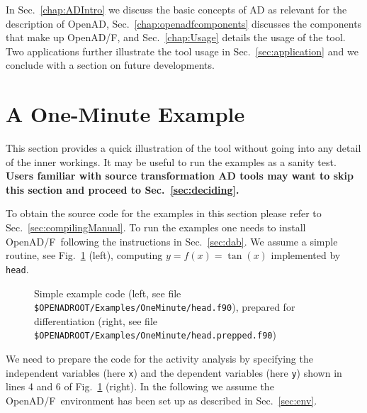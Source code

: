\documentclass{book}
\newcommand{\OpenADF}{OpenAD/F}
\newcommand{\OpenAD}{OpenAD}
\newcommand{\refsec}[1]{{Sec.~\ref{#1}}}
\newcommand{\reffig}[1]{{Fig.~\ref{#1}}}
\begin{document}
In \refsec{chap:ADIntro} we discuss the basic concepts of AD as relevant for 
the description of \OpenAD, \refsec{chap:openadfcomponents} discusses the components 
that make up \OpenADF, and \refsec{chap:Usage} details the usage of the tool. 
Two applications further illustrate the tool usage in \refsec{sec:application} and 
we conclude with a section on future developments.

\section{A One-Minute Example} \label{sec:oneMinute}

This section provides a quick illustration of the tool without going into any detail of 
the inner workings. It may be useful to run the examples as a sanity test. \\
{\bf {\Large \ForwardToIndex }  Users familiar with source transformation AD tools may want to skip this section and proceed  to \refsec{sec:deciding}.}

To obtain the source code for the examples in this section please refer to \refsec{sec:compilingManual}. 
To run the examples one needs to install \OpenADF\ following the instructions in \refsec{sec:dab}.
We assume a simple routine, see \reffig{fig:OneMinute} (left), computing $y=f(x)=\tan(x)$ implemented by \lstinline{head}.
\begin{figure}
\begin{minipage}[t]{.48\linewidth}
\scriptsize
\end{minipage}
\begin{minipage}[t]{.48\linewidth}
\scriptsize
\end{minipage}
\caption{Simple example code (left, see file 
\lstinline{$OPENADROOT/Examples/OneMinute/head.f90}), %
prepared for differentiation (right, see file 
\lstinline{$OPENADROOT/Examples/OneMinute/head.prepped.f90})}%
\label{fig:OneMinute}
\end{figure}
We need to prepare the code for the activity analysis by specifying the independent variables
(here \lstinline{x}) and the dependent variables 
(here \lstinline{y}) shown in lines 4 and 6 of \reffig{fig:OneMinute} (right).
In the following we assume the \OpenADF\ environment has been set up as 
described in \refsec{sec:env}.
\end{document}
